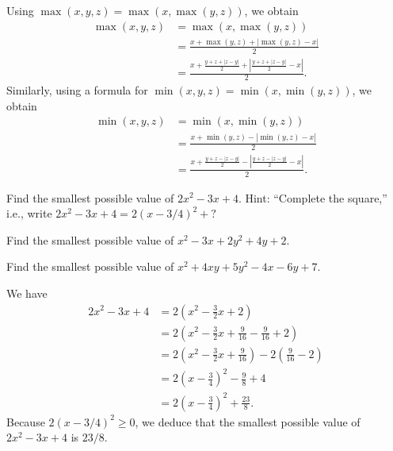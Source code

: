 Using $\max(x, y, z) = \max(x, \max(y, z))$, we obtain
\begin{align*}
	\max(x, y, z) & = \max(x, \max(y, z))                                                                     \\
	              & = \frac{x + \max(y, z) + |\max(y, z) - x|}{2}                                             \\
	              & = \frac{x + \frac{y + z + |z - y|}{2} + \left| \frac{y + z + |z - y|}{2} - x \right|}{2}.
\end{align*}
Similarly, using a formula for $\min(x, y, z) = \min(x, \min(y, z))$, we obtain
\begin{align*}
	\min(x, y, z) & = \min(x, \min(y, z))                                                                     \\
	              & = \frac{x + \min(y, z) - |\min(y, z) - x|}{2}                                             \\
	              & = \frac{x + \frac{y + z - |z - y|}{2} - \left| \frac{y + z - |z - y|}{2} - x \right|}{2}.
\end{align*}


\addtocounter{problem}{3}
\Newpage
\begin{problem} %
	\label{nprop:p:17}
	\hfill

	\begin{lenumerate}
		\item \label{nprop:p:17:1}
		      Find the smallest possible value of $2 x^2 - 3 x + 4$. Hint: ``Complete the square,'' i.e., write $2 x^2 - 3 x + 4 = 2(x - 3 / 4)^2 + ?$
		\item \label{nprop:p:17:2}
		      Find the smallest possible value of $x^2 - 3 x + 2 y^2 + 4 y + 2$.
		\item \label{nprop:p:17:3}
		      Find the smallest possible value of $x^2 + 4 x y + 5 y^2 - 4 x - 6 y + 7$.
	\end{lenumerate}
\end{problem}

We have
\begin{align*}
	2 x^2 - 3 x + 4 & = 2 \left( x^2 - \frac{3}{2} x + 2 \right)                                               \\
	                & = 2 \left( x^2 - \frac{3}{2} x + \frac{9}{16} - \frac{9}{16} + 2 \right)                 \\
	                & = 2 \left( x^2 - \frac{3}{2} x + \frac{9}{16} \right) - 2 \left(\frac{9}{16} - 2 \right) \\
	                & = 2 \left( x - \frac{3}{4} \right)^2 - \frac{9}{8} + 4                                   \\
	                & = 2 \left( x - \frac{3}{4} \right)^2 + \frac{23}{8}.
\end{align*}
Because $2 (x - 3 / 4)^2 \geq 0$, we deduce that the smallest possible value of $2 x^2 - 3 x + 4$ is $23 / 8$.

